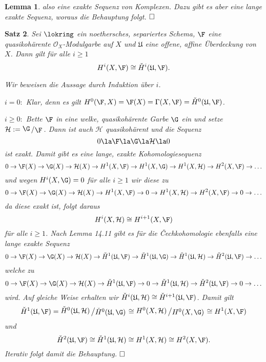 \documentclass[11pt]{book}
\newtheorem{theorem}{Satz}[section]
\newtheorem{lemma}[theorem]{Lemma}
\theoremstyle{nonumberbreak}
\newenvironment{pr}[1][]{\ifthenelse{\equal{#1}{}}{\proof}{\proof[#1]}\rm}{\endproof}
\newcommand{\slant}[2]{{\raisebox{.1em}{$#1$}\left/\raisebox{-.1em}{$#2$}\right.}}
\begin{document}
\begin{spacing}{1.4}
\begin{lemma}
\begin{pr}
also eine exakte Sequenz von Komplexen. Dazu gibt es aber eine lange exakte Sequenz, woraus die Behauptung folgt. $\hfill \Box$
\end{pr}
\end{lemma}


\begin{theorem}    %
Sei $\lokring$ ein noethersches, separiertes Schema, $\F$ eine quasikohärente $\mathcal{O}_X$-Modulgarbe auf $X$ und $\mathfrak{U}$ eine offene, affine Überdeckung von $X$. Dann gilt für alle $i \geqslant 1$
$$H^{i}(X, \F) \cong \check{H}^{i}(\mathfrak{U}, \F).$$

\begin{pr}
Wir beweisen die Aussage durch Induktion über $i$.
\begin{compactenum}
\item[$i=0:$] Klar, denn es gilt $H^{0}(\F, X) = \F(X) = \Gamma(X, \F) = \check{H}^{0}(\mathfrak{U}, \F)$.
\item[$i \geqslant 0:$] Bette $\F$ in eine welke, quasikohärente Garbe $\G$ ein und setze $\mathcal{H}:= \slant{\G}{\F}$. Dann ist auch $\mathcal{H}$ quasikohärent und die Sequenz 
$$0 \la \F \la \G \la \mathcal{H} \la 0$$
ist exakt. Damit gibt es eine lange, exakte Kohomologiesequenz
$$0 \rightarrow \F(X) \rightarrow \G(X) \rightarrow \mathcal{H}(X) \rightarrow H^{1}(X, \F) \rightarrow H^{1}(X, \G) \rightarrow H^{1}(X, \mathcal{H}) \rightarrow H^{2}(X, \F) \rightarrow  \ldots $$
und wegen $H^{i}(X, \G)= 0$ für alle $i \geqslant 1$ wir diese zu
$$0 \rightarrow \F(X) \rightarrow \G(X) \rightarrow \mathcal{H}(X) \rightarrow H^{1}(X, \F) \rightarrow 0 \rightarrow H^{1}(X, \mathcal{H}) \rightarrow H^{2}(X, \F) \rightarrow 0 \rightarrow  \ldots $$
da diese exakt ist, folgt daraus
$$H^{i}(X, \mathcal{H}) \cong H^{i+1}(X, \F)$$
für alle $i \geqslant 1$. Nach Lemma 14.11 gibt es für die \v{C}echkohomologie ebenfalls eine lange exakte Sequenz
$$0 \rightarrow \F(X) \rightarrow \G(X) \rightarrow \mathcal{H}(X) \rightarrow \check{H}^{1}(\mathfrak{U}, \F) \rightarrow \check{H}^{1}(\mathfrak{U}, \G) \rightarrow \check{H}^{1}(\mathfrak{U}, \mathcal{H}) \rightarrow \check{H}^{2}(\mathfrak{U}, \F) \rightarrow  \ldots $$
welche zu 
$$0 \rightarrow \F(X) \rightarrow \G(X) \rightarrow \mathcal{H}(X) \rightarrow \check{H}^{1}(\mathfrak{U}, \F) \rightarrow 0 \rightarrow \check{H}^{1}(\mathfrak{U}, \mathcal{H}) \rightarrow \check{H}^{2}(\mathfrak{U}, \F) \rightarrow 0 \rightarrow  \ldots $$
wird. Auf gleiche Weise erhalten wir $\check{H}^{i}(\mathfrak{U}, \mathcal{H}) \cong \check{H}^{i+1}(\mathfrak{U}, \F)$. Damit gilt 
$$\check{H}^{1}(\mathfrak{U}, \F) = \slant{\check{H}^{0}(\mathfrak{U}, \mathcal{H})}{\check{H}^{0}(\mathfrak{U}, \G)} \cong \slant{H^{0}(X, \mathcal{H})}{H^{0}(X, \G)} \cong H^{1}(X, \F)$$
und 
$$\check{H}^2(\mathfrak{U}, \F) \cong \check{H}^{1}(\mathfrak{U}, \mathcal{H}) \cong H^{1}(X, \mathcal{H}) \cong H^{2}(X, \F).$$
Iterativ folgt damit die Behauptung. $\hfill \Box$


\end{compactenum}
\end{pr}
\end{theorem}
\end{spacing}
\end{document}
